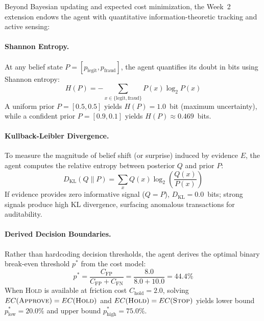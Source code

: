 \documentclass{article}
\begin{document}
Beyond Bayesian updating and expected cost minimization, the Week~2 extension endows the agent with quantitative information-theoretic tracking and active sensing:

\paragraph{Shannon Entropy.}
At any belief state $P = [p_{\text{legit}}, p_{\text{fraud}}]$, the agent quantifies its doubt in bits using Shannon entropy:
\begin{equation}
H(P) = -\sum_{x \in \{\text{legit}, \text{fraud}\}} P(x) \log_2 P(x)
\end{equation}
A uniform prior $P=[0.5, 0.5]$ yields $H(P)=1.0$~bit (maximum uncertainty), while a confident prior $P=[0.9, 0.1]$ yields $H(P) \approx 0.469$~bits.

\paragraph{Kullback-Leibler Divergence.}
To measure the magnitude of belief shift (or surprise) induced by evidence $E$, the agent computes the relative entropy between posterior $Q$ and prior $P$:
\begin{equation}
D_{\text{KL}}(Q \parallel P) = \sum_{x} Q(x) \log_2 \left( \frac{Q(x)}{P(x)} \right)
\end{equation}
If evidence provides zero informative signal ($Q=P$), $D_{\text{KL}} = 0.0$~bits; strong signals produce high KL divergence, surfacing anomalous transactions for auditability.

\paragraph{Derived Decision Boundaries.}
Rather than hardcoding decision thresholds, the agent derives the optimal binary break-even threshold $p^*$ from the cost model:
\begin{equation}
p^* = \frac{C_{\text{FP}}}{C_{\text{FP}} + C_{\text{FN}}} = \frac{8.0}{8.0 + 10.0} = 44.4\%
\end{equation}
When \textsc{Hold} is available at friction cost $C_{\text{hold}}=2.0$, solving $EC(\textsc{Approve}) = EC(\textsc{Hold})$ and $EC(\textsc{Hold}) = EC(\textsc{Stop})$ yields lower bound $p^*_{\text{low}} = 20.0\%$ and upper bound $p^*_{\text{high}} = 75.0\%$.
\end{document}
